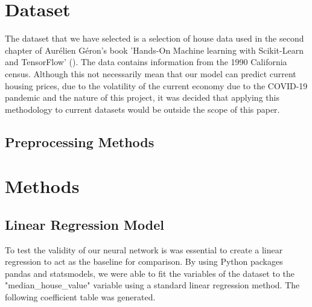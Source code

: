 \documentclass[11pt]{article}
\begin{document}
\section{Dataset}

The dataset that we have selected is a selection of house data used in the second chapter of Aurélien Géron's book 'Hands-On Machine learning with Scikit-Learn and TensorFlow'  (\citeyear{Geron2022}). The data contains information from the 1990 California census. Although this not necessarily mean that our model can predict current housing prices, due to the volatility of the current economy due to the COVID-19 pandemic and the nature of this project, it was decided that applying this methodology to current datasets would be outside the scope of this paper.

\subsection{Preprocessing Methods}



\section{Methods}

\subsection{Linear Regression Model}

To test the validity of our neural network is was essential to create a linear regression to act as the baseline for comparison. By using Python packages pandas and statsmodels, we were able to fit the variables of the dataset to the "median\_house\_value" variable using a standard linear regression method. The following coefficient table was generated.
\end{document}

